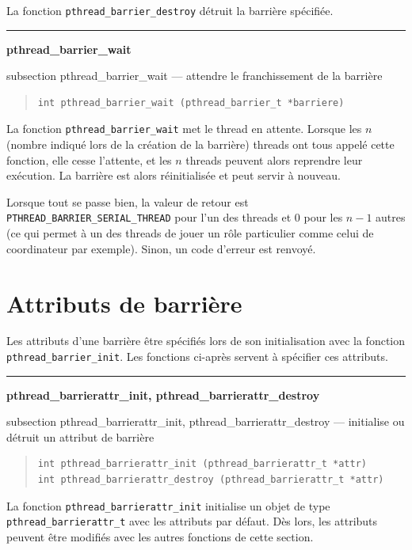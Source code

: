 \documentclass [twoside] {report}
\newcommand {\primitive} [1]
    {
	\phantomsection
	{\large \textbf {#1}}
	\addcontentsline {toc} {subsection} {#1}
    }
\newcommand {\separation}
    {
	\vspace {5mm}
	\nopagebreak
	\hrule
    }
\begin{document}
La fonction \verb|pthread_barrier_destroy| détruit la barrière spécifiée.


\separation
\primitive {pthread\_barrier\_wait} --- attendre le franchissement de la barrière

\begin {quote}
\begin {verbatim}
int pthread_barrier_wait (pthread_barrier_t *barriere)
\end{verbatim}
\end {quote}

La fonction \verb|pthread_barrier_wait| met le thread en attente. Lorsque
les $n$ (nombre indiqué lors de la création de la barrière) threads
ont tous appelé cette fonction, elle cesse l'attente, et les $n$
threads peuvent alors reprendre leur exécution. La barrière est alors
réinitialisée et peut servir à nouveau.

Lorsque tout se passe bien, la valeur de retour est
\verb|PTHREAD_BARRIER_SERIAL_THREAD| pour l'un des threads et 0 pour
les $n-1$ autres (ce qui permet à un des threads de jouer un rôle
particulier comme celui de coordinateur par exemple). Sinon, un code
d'erreur est renvoyé.


\section {Attributs de barrière}

Les attributs d'une barrière être spécifiés lors de son initialisation
avec la fonction \verb|pthread_barrier_init|. Les fonctions ci-après
servent à spécifier ces attributs.

\separation
\primitive {pthread\_barrierattr\_init, pthread\_barrierattr\_destroy} ---
initialise ou détruit un attribut de barrière

\begin {quote}
\begin {verbatim}
int pthread_barrierattr_init (pthread_barrierattr_t *attr)
int pthread_barrierattr_destroy (pthread_barrierattr_t *attr)
\end{verbatim}
\end {quote}

La fonction \verb|pthread_barrierattr_init| initialise un objet de type
\verb|pthread_barrierattr_t| avec les attributs par défaut. Dès lors,
les attributs peuvent être modifiés avec les autres fonctions de
cette section.
\end{document}
